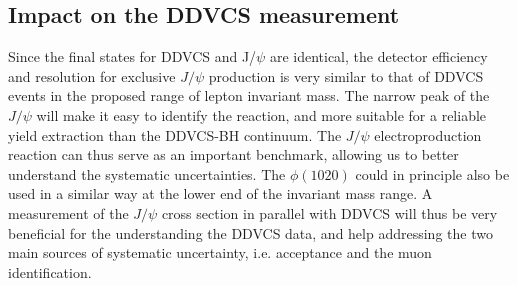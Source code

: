 \subsection{Impact on the DDVCS measurement}
\label{sec:jpsi_ddvcs}


Since the final states for DDVCS and J/$\psi$ are identical, the detector efficiency and resolution for exclusive $J/\psi$
production is very similar to that of DDVCS events in the proposed range of lepton invariant mass. The narrow peak of the $J/\psi$ will make it easy to identify the reaction, and more suitable for a reliable yield extraction than the DDVCS-BH continuum. The $J/\psi$ electroproduction
reaction can thus serve as an important benchmark, allowing us to better
understand the systematic uncertainties.
The $\phi(1020)$ could in principle also be used in a similar way at the
lower end of the invariant mass range.
A measurement of the $J/\psi$ cross section in parallel with DDVCS will thus
be very beneficial for the understanding the DDVCS data, and help addressing
the two main sources of systematic uncertainty, i.e. acceptance
and the muon identification.



